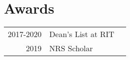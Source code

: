 \documentclass[]{deedy-resume-openfont}
\begin{document}
\begin{minipage}[t]{0.67\textwidth}



%
%


\section{Awards}
\begin{tabular}{rll}
2017-2020	   & Dean's List at RIT \\
2019         & NRS Scholar \\
\end{tabular}
\sectionsep

\sectionsep

\end{minipage}
\end{document}

